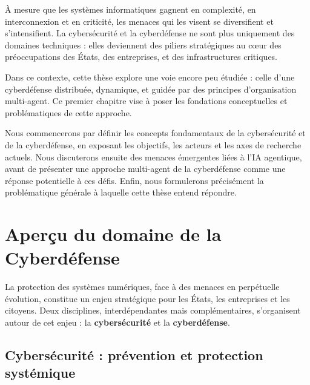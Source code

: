 \documentclass[ twoside,openright,titlepage,numbers=noenddot,headinclude,%
                footinclude=true,cleardoublepage=empty,abstractoff, %
                BCOR=5mm,paper=a4,fontsize=11pt,%
                french,american,%
                ]{scrreprt}
\begin{document}
\noindent
À mesure que les systèmes informatiques gagnent en complexité, en interconnexion et en criticité, les menaces qui les visent se diversifient et s'intensifient. La cybersécurité et la cyberdéfense ne sont plus uniquement des domaines techniques : elles deviennent des piliers stratégiques au cœur des préoccupations des États, des entreprises, et des infrastructures critiques.

Dans ce contexte, cette thèse explore une voie encore peu étudiée : celle d'une cyberdéfense distribuée, dynamique, et guidée par des principes d'organisation multi-agent. Ce premier chapitre vise à poser les fondations conceptuelles et problématiques de cette approche.

Nous commencerons par définir les concepts fondamentaux de la cybersécurité et de la cyberdéfense, en exposant les objectifs, les acteurs et les axes de recherche actuels. Nous discuterons ensuite des menaces émergentes liées à l'IA agentique, avant de présenter une approche multi-agent de la cyberdéfense comme une réponse potentielle à ces défis. Enfin, nous formulerons précisément la problématique générale à laquelle cette thèse entend répondre.

\section{Aperçu du domaine de la Cyberdéfense}\label{sec:cyberdef-panorama}


La protection des systèmes numériques, face à des menaces en perpétuelle évolution, constitue un enjeu stratégique pour les États, les entreprises et les citoyens. Deux disciplines, interdépendantes mais complémentaires, s'organisent autour de cet enjeu : la \textbf{cybersécurité} et la \textbf{cyberdéfense}.

\subsection*{Cybersécurité : prévention et protection systémique}
\end{document}
